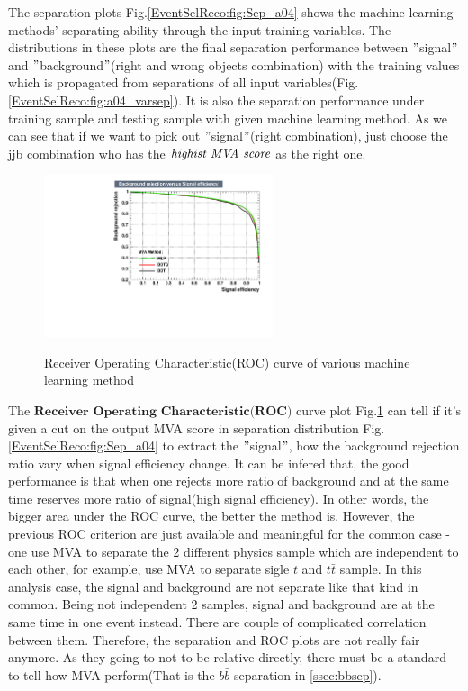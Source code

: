 			The separation plots Fig.\ref{EventSelReco:fig:Sep_a04} shows the machine learning methods' separating ability through the input training variables. The distributions in these plots are the final separation performance between $"$signal$"$ and $"$background$"$(right and wrong objects combination) with the training values which is propagated from separations of all input variables(Fig.\ref{EventSelReco:fig:a04_varsep}). It is also the separation performance under training sample and testing sample with given machine learning method. As we can see that if we want to pick out $"$signal$"$(right combination), just choose the jjb combination who has the $\emph{highist MVA score}$ as the right one.

			\begin{figure}[H]
			\centering{}
			    \includegraphics[width=0.6\textwidth]{Figures/EventSelReco/mva/a04_all_ROC.pdf}\\
			\caption{Receiver Operating Characteristic(ROC) curve of various machine learning method}
			\label{EventSelReco:fig:ROC_a04}
			\end{figure}
			\FloatBarrier
	
			The $\textbf{Receiver Operating Characteristic(ROC)}$ curve plot Fig.\ref{EventSelReco:fig:ROC_a04} can tell if it's given a cut on the output MVA score in separation distribution Fig.\ref{EventSelReco:fig:Sep_a04} to extract the $"$signal$"$, how the background rejection ratio vary when signal efficiency change. It can be infered that, the good performance is that when one rejects more ratio of background and at the same time reserves more ratio of signal(high signal efficiency). In other words, the bigger area under the ROC curve, the better the method is. However, the previous ROC criterion are just available and meaningful for the common case - one use MVA to separate the 2 different physics sample which are independent to each other, for example, use MVA to separate sigle $t$ and $t\bar{t}$ sample. In this analysis case, the signal and background are not separate like that kind in common. Being not independent 2 samples, signal and background are at the same time in one event instead. There are couple of complicated correlation between them. Therefore, the separation and ROC plots are not really fair anymore. As they going to not to be relative directly, there must be a standard to tell how MVA perform(That is the $b\bar{b}$ separation in \ref{ssec:bbsep}).

